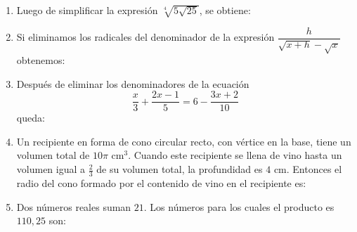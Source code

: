 \documentclass[11pt]{article}
\begin{document}
\begin{enumerate}
\item Luego de simplificar la expresión $\sqrt[4]{5\sqrt{25}}$, se obtiene:

\item Si eliminamos los radicales del denominador de la expresión $\dfrac{h}{\sqrt{x + h} - \sqrt{x}}$ obtenemos:

\item Después de eliminar los denominadores de la ecuación
\[
\frac{x}{3} + \frac{2x - 1}{5} = 6 - \frac{3x + 2}{10}
\]
queda:

\item Un recipiente en forma de cono circular recto, con vértice en la base, tiene un volumen total de $10\pi$ cm$^3$. Cuando este recipiente se llena de vino hasta un volumen igual a $\tfrac{2}{3}$ de su volumen total, la profundidad es $4$ cm. Entonces el radio del cono formado por el contenido de vino en el recipiente es:

\item Dos números reales suman $21$. Los números para los cuales el producto es $110{,}25$ son:


\end{enumerate}
\end{document}

